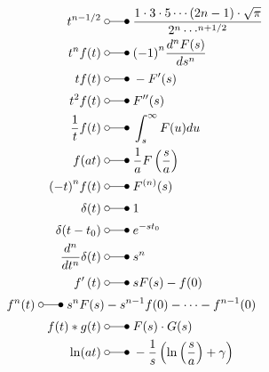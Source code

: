 \begin{align*}
    t^{n-1/2}                       \;                      & \laplace\; \frac{1\cdot3\cdot5\cdots(2n-1)\cdot\sqrt{\pi}}{2^n\cdots^{n+1/2}} \\
    t^{n}f(t)                       \;                      & \laplace\; {(-1)}^n \frac{d^{n}F(s)}{ds^n}                                    \\
    tf(t)                           \;                      & \laplace\; -F^{\prime}(s)                                                     \\
    t^{2}f(t)                       \;                      & \laplace\; F^{\prime\prime}(s)                                                \\
    \frac{1}{t}f(t)                 \;                      & \laplace\; \int_{s}^{\infty}F(u)du                                            \\
    f(at)                           \;                      & \laplace\; \frac{1}{a}F\left(\frac{s}{a}\right)                               \\
    {(-t)}^n f(t)                   \;                      & \laplace\; F^{(n)}(s)                                                         \\
    \delta(t)                       \;                      & \laplace\; 1                                                                  \\
    \delta(t-t_{0})                 \;                      & \laplace\; e^{-st_{0}}                                                        \\
    \frac{d^{n}}{dt^{n}}\delta(t)   \;                      & \laplace\; s^{n}                                                              \\
    f^{\prime}\left(t\right)        \;                      & \laplace\; \begin{aligned}sF(s)-f(0)\end{aligned}                             \\
    f^{n}(t)                        \; \laplace\; s^{n}F(s) & -s^{n-1}f(0)-\cdots-f^{n-1}(0)                                                \\
    f(t)*g(t)                       \;                      & \laplace\; \begin{aligned}F(s)\cdot G(s)\end{aligned}                         \\
    \ln(at)                         \;                      & \laplace\; -\frac{1}{s}\left(\ln\left(\frac sa\right)+\gamma\right)           \\

\end{align*}
